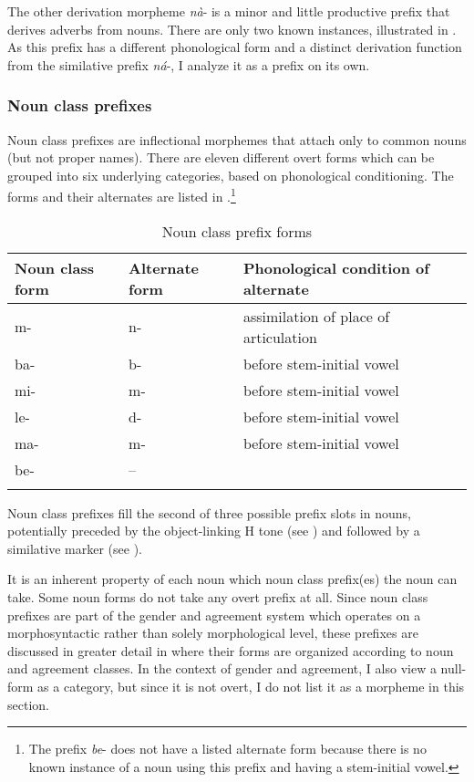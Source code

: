 The other derivation morpheme {\itshape nà}- is a minor and little productive prefix that derives adverbs from nouns. There are only two known instances, illustrated in . As this prefix has a different phonological form and a distinct derivation function from the similative prefix {\itshape ná}-, I analyze it as a prefix on its own.



\subsubsection{Noun class prefixes}
\label{sec:NCPre}

Noun class prefixes are inflectional morphemes that attach only to common nouns (but not proper names). There are eleven different overt forms which can be grouped into six underlying categories, based on phonological conditioning. The forms and their alternates are listed in .\footnote{The prefix {\itshape be}- does not have a listed alternate form because there is no known instance of a noun using this prefix and having a stem-initial vowel.}

\begin{table}
\begin{tabular}{lll}
 \lsptoprule
Noun class form & Alternate form  & Phonological condition of alternate \\
 \midrule
m- & n- &  assimilation of place of articulation \\
ba- & b- & before stem-initial vowel \\ 
mi- & m- & before stem-initial vowel \\
le- & d- &  before stem-initial vowel \\
ma- & m- & before stem-initial vowel \\
be- & -- & \\
 \lspbottomrule
\end{tabular}
\caption{Noun class prefix forms}
\label{Tab:NCmorph}
\end{table} 

\noindent  Noun class prefixes fill the second of three possible prefix slots in nouns, potentially preceded by the object-linking H tone (see ) and followed by a similative marker (see ). 

It is an inherent property of each noun which noun class prefix(es) the noun can take. Some noun forms do not take any overt prefix at all. Since noun class prefixes are part of the gender and agreement system which operates on a morphosyntactic rather than solely morphological level,  these prefixes  are discussed in greater detail in  where their forms are organized according to noun and agreement classes. In the context of gender and agreement, I also view a null-form as a category, but since it is not overt, I do not list it as a morpheme in this section.




